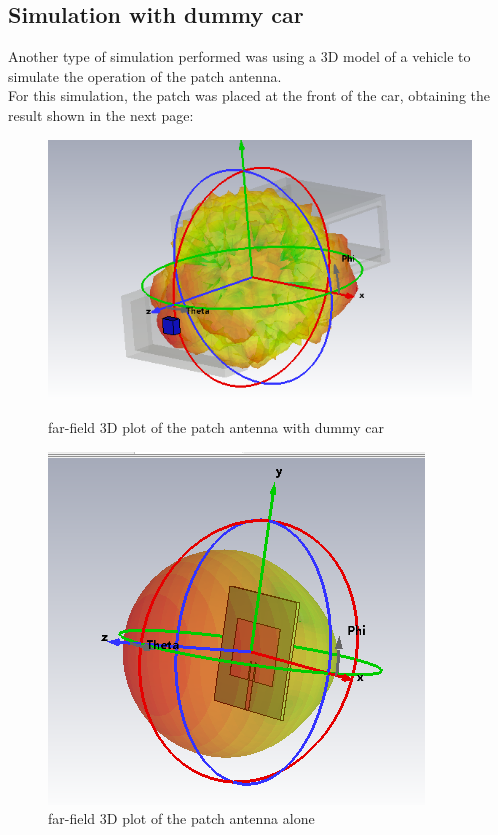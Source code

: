 \documentclass[]{article}
\begin{document}
\subsection{Simulation with dummy car}
Another type of simulation performed was using a 3D model of a vehicle to simulate the operation of the patch antenna.\\
For this simulation, the patch was placed at the front of the car, obtaining the result shown in the next page: 
\begin{figure}[H]
	\centering
	\begin{minipage}{0.41\linewidth}
		\centering
		\includegraphics[width=\linewidth]{img/3D_farfield_front_car}
		\caption{far-field 3D plot of the patch antenna with dummy car }
		\label{3Ddummycar}
	\end{minipage}\hspace{0.1\linewidth}
	\begin{minipage}{0.40\linewidth}
		\centering
		\includegraphics[width=\linewidth]{img/3d_farfield_patchsolo}
		\caption{far-field 3D plot of the patch antenna alone}
		\label{3Dpatch}
	\end{minipage}
\end{figure}
\end{document}
